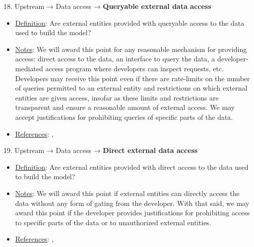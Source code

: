 18. Upstream → Data access → \textbf{Queryable external data access}
\vspace{-\parskip}
\begin{itemize}
\item
\underline{Definition}: Are external entities provided with queryable access to the data used to build the model?
\item
\underline{Notes}: We will award this point for any reasonable mechanism for providing access: direct access to the data, an interface to query the data, a developer-mediated access program where developers can inspect requests, etc. Developers may receive this point even if there are rate-limits on the number of queries permitted to an external entity and restrictions on which external entities are given access, insofar as these limits and restrictions are transparent and ensure a reasonable amount of external access. We may accept justifications for prohibiting queries of specific parts of the data.
\item
\underline{References}: \citet{gebru2021datasheets}, \citet{piktus2023roots}
\end{itemize} \vspace{\baselineskip}


19. Upstream → Data access → \textbf{Direct external data access}
\vspace{-\parskip}
\begin{itemize}
\item
\underline{Definition}: Are external entities provided with direct access to the data used to build the model?
\item
\underline{Notes}: We will award this point if external entities can directly access the data without any form of gating from the developer. With that said, we may award this point if the developer provides justifications for prohibiting access to specific parts of the data or to unauthorized external entities.
\item
\underline{References}: \citet{gebru2021datasheets}, \citet{piktus2023roots}
\end{itemize} \vspace{\baselineskip}


